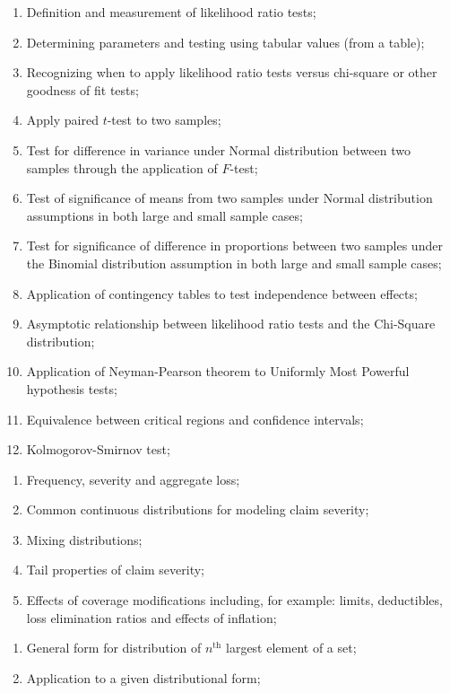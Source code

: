 \documentclass[12pt, titlepage, french]{report}
\begin{document}
\begin{outcomes}
\begin{enumerate}[label = \alph*.]
	\item	Definition and measurement of likelihood ratio tests;
	\item	Determining parameters and testing using tabular values (from a table);
	\item	Recognizing when to apply likelihood ratio tests versus chi-square or other goodness of fit tests;
	\item	Apply paired $t$-test to two samples;
	\item	Test for difference in variance under Normal distribution between two samples through the application of $F$-test;
	\item	Test of significance of means from two samples under Normal distribution assumptions in both large and small sample cases;
	\item	Test for significance of difference in proportions between two samples under the Binomial distribution assumption in both large and small sample cases;
	\item	Application of contingency tables to test independence between effects;
	\item	Asymptotic relationship between likelihood ratio tests and the Chi-Square distribution;
	\item	Application of Neyman-Pearson theorem to Uniformly Most Powerful hypothesis tests;
	\item	Equivalence between critical regions and confidence intervals;
	\item	Kolmogorov-Smirnov test;
\end{enumerate}
\tcbline
\begin{enumerate}[label = \alph*.]
	\item	Frequency, severity and aggregate loss;
	\item	Common continuous distributions for modeling claim severity;
	\item	Mixing distributions;
	\item	Tail properties of claim severity;
	\item	Effects of coverage modifications including, for example: limits, deductibles, loss elimination ratios and effects of inflation;
\end{enumerate}
\tcbline
\begin{enumerate}[label = \alph*.]
	\item	General form for distribution of $n^{\text{th}}$ largest element of a set;
	\item	Application to a given distributional form;
\end{enumerate}
\end{outcomes}
\end{document}
